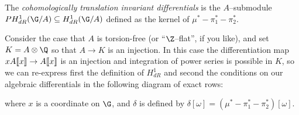 \begin{definition}
The \textit{cohomologically translation invariant differentials} is the $A$--submodule $PH^1_{dR}(\G/A) \subseteq H^1_{dR}(\G/A)$ defined as the kernel of $\mu^* - \pi_1^* - \pi_2^*$.
\end{definition}

\begin{example}{\cite[Lemma 5.1.2]{Katz}}
Consider the case that $A$ is torsion-free (or ``$\Z$--flat'', if you like), and set $K = A \otimes \Q$ so that $A \to K$ is an injection.  In this case the differentiation map $x A\llbracket{x}\rrbracket \to A\llbracket{x}\rrbracket$ is an injection and integration of power series is possible in $K$, so we can re-express first the definition of $H^1_{dR}$ and second the conditions on our algebraic differentials in the following diagram of exact rows:
\begin{center}
\end{center}
where $x$ is a coordinate on $\G$, and $\delta$ is defined by $\delta [\omega] = (\mu^* - \pi_1^* - \pi_2^*)[\omega]$.
\end{example}

